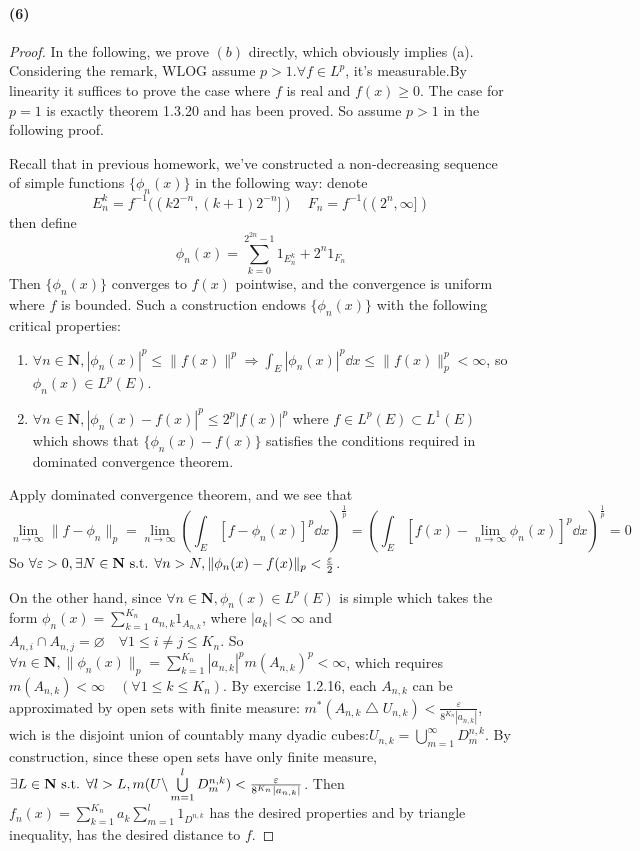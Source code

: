 \documentclass{article}
\begin{document}
\paragraph{(6)}
\begin{proof}
In the following, we prove $(b)$ directly, which obviously implies (a). Considering the remark, WLOG assume $p>1$.$\forall f\in L^p$, it's measurable.By linearity it suffices to prove the case where $f$ is real and $f(x)\geq 0$.
The case for $p=1$ is exactly theorem 1.3.20 and has been proved. So assume $p>1$ in the following proof.



Recall that in previous homework, we've constructed a non-decreasing sequence of simple functions $\{\phi_n(x)\}$ in the following way: denote
\[E_n^k=f^{-1}((k2^{-n},(k+1)2^{-n}])\quad F_n=f^{-1}((2^n,\infty])\]
then define\[\phi_n(x)=\sum_{k=0}^{2^{2n}-1}1_{E_n^k}+2^n1_{F_n}\]
Then $\{\phi_n(x)\}$ converges to $f(x)$ pointwise, and the convergence is uniform where $f$ is bounded. Such a construction endows $\{\phi_n(x)\}$ with the following critical properties:
\begin{enumerate}
\item $\forall n\in\mathbf{N}, |\phi_n(x)|^p\leq \|f(x)\|^p\Rightarrow \int_E|\phi_n(x)|^p\dd x\leq \|f(x)\|_p^p<\infty$, so $\phi_n(x)\in L^p(E)$.
\item $\forall n\in\mathbf{N}, |\phi_n(x)-f(x)|^p\leq 2^p|f(x)|^p$ where $f\in L^p(E)\subset L^1(E)$ which shows that $\{\phi_n(x)-f(x)\}$ satisfies the conditions required in dominated convergence theorem.
\end{enumerate}
Apply dominated convergence theorem, and we see that 
\[\lim_{n\to\infty}\|f-\phi_n\|_p=\lim_{n\to\infty}(\int_E [f-\phi_n(x)]^p\dd x)^{\frac 1 p}=(\int_E [f(x)-\lim_{n\to\infty}\phi_n(x)]^p\dd x)^{\frac 1 p}=0\]
So $\forall\varepsilon>0,\exists N\in \mathbf{N}\text{ s.t. } \forall n>N,\|\phi_n(x)-f(x)\|_p<\frac{\varepsilon}{2}$.

On the other hand, since $\forall n\in\mathbf{N},\phi_n(x)\in L^p(E)$ is simple which takes the form $\phi_n(x)=\sum\limits_{k=1}^{K_n}a_{n,k} 1_{A_{n,k}}$, where $|a_k|<\infty$ and $A_{n,i}\cap A_{n,j}=\varnothing\quad \forall 1\leq i\neq j\leq K_n$. So $\forall n\in\mathbf{N},\|\phi_n(x)\|_p=\sum\limits_{k=1}^{K_n}|a_{n,k}|^p m(A_{n,k})^p<\infty$, which requires $m(A_{n,k})<\infty\quad (\forall 1\leq k\leq K_n)$. By exercise 1.2.16, each $A_{n,k}$ can be approximated by open sets with finite measure: $m^*(A_{n,k}\bigtriangleup U_{n,k})<\frac{\varepsilon}{8^{K_n}|a_{n,k}|}$, wich is the disjoint union of countably many dyadic cubes:$U_{n,k}=\bigcup\limits_{m=1}^\infty D^{n,k}_m$. By construction, since these open sets have only finite measure, $\exists L\in \mathbf{N}\text{ s.t. }\forall l>L, m(U\backslash \bigcup\limits_{m=1}^{l}D^{n,k}_m)<\frac{\varepsilon}{8^{K_n}|a_{n,k}|}$. Then $f_n(x)=\sum\limits_{k=1}^{K_n}a_k\sum\limits_{m=1}^l 1_{D^{n,k}}$ has the desired properties and by triangle inequality, has the desired distance to $f$.
\end{proof}
\end{document}
